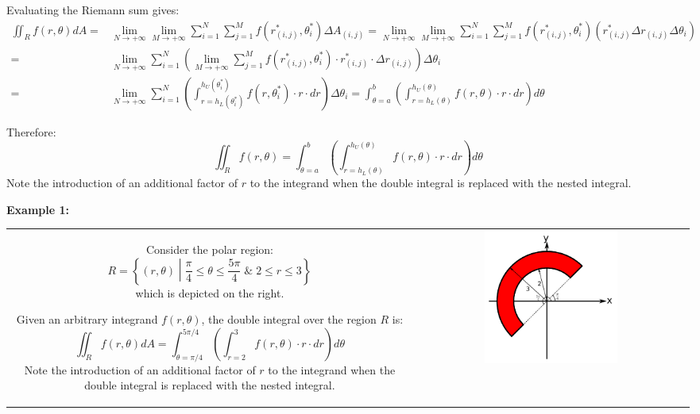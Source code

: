 \documentclass{article}
\begin{document}
Evaluating the Riemann sum gives:
\begin{align*}
\iint_R f(r,\theta)dA = & \lim_{N \rightarrow +\infty} \lim_{M \rightarrow +\infty} \sum_{i = 1}^N \sum_{j = 1}^M f(r_{(i,j)}^*, \theta_i^*)\Delta A_{(i,j)}
= \lim_{N \rightarrow +\infty} \lim_{M \rightarrow +\infty} \sum_{i = 1}^N \sum_{j = 1}^M f(r_{(i,j)}^*, \theta_i^*)(r_{(i,j)}^* \Delta r_{(i,j)} \Delta\theta_i) \\
= & \lim_{N \rightarrow +\infty} \sum_{i = 1}^N \left(\lim_{M \rightarrow +\infty} \sum_{j = 1}^M f(r_{(i,j)}^*, \theta_i^*) \cdot r_{(i,j)}^* \cdot \Delta r_{(i,j)}\right) \Delta\theta_i \\
= & \lim_{N \rightarrow +\infty} \sum_{i = 1}^N \left(\int_{r = h_L(\theta_i^*)}^{h_U(\theta_i^*)} f(r, \theta_i^*) \cdot r \cdot dr\right) \Delta\theta_i 
= \int_{\theta = a}^b \left(\int_{r = h_L(\theta)}^{h_U(\theta)} f(r, \theta) \cdot r \cdot dr\right) d\theta 
\end{align*}

Therefore:
\[\iint_R f(r,\theta) = \int_{\theta = a}^b \left(\int_{r = h_L(\theta)}^{h_U(\theta)} f(r, \theta) \cdot r \cdot dr\right) d\theta\]
Note the introduction of an additional factor of \(r\) to the integrand when the double integral is replaced with the nested integral.



\vspace{5mm}

\textbf{Example 1:}

\begin{tabular}{cc}
\parbox{0.5\textwidth}{
Consider the polar region:
\[R = \left\{(r, \theta) \middle| \frac{\pi}{4} \leq \theta \leq \frac{5\pi}{4} \;\&\; 2 \leq r \leq 3 \right\}\]
which is depicted on the right. 

Given an arbitrary integrand \(f(r,\theta)\), the double integral over the region \(R\) is: 
\[\iint_R f(r,\theta)dA = \int_{\theta = \pi/4}^{5\pi/4} \left(\int_{r = 2}^3 f(r, \theta) \cdot r \cdot dr\right)d\theta\]
Note the introduction of an additional factor of \(r\) to the integrand when the double integral is replaced with the nested integral.
} & \parbox{0.5\textwidth}{
\includegraphics[width = 0.5\textwidth]{Polar_region_1}
}
\end{tabular}
\end{document}
